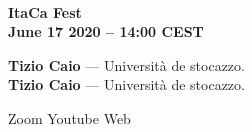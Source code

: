 \documentclass{article}
\makeatletter
\def\fsize#1#2{\fontsize{#1}{#1}\selectfont #2}
\newcommand{\talk}[3]{
  {\textbf{#1}} --- #2. \textit{#3}
} %
\makeatother
\begin{document}
\begin{flushright}
  \hrulefill\\[2mm]
  \noindent\fsize{40}{\textbf{ItaCa Fest}}\\[5mm]
  \fsize{25}{\textbf{June 17 2020 -- 14:00 CEST}}\\[5mm]
\end{flushright}

\large
\talk{Tizio Caio}{Università de stocazzo}{\lipsum[2]}\\[2em]

\talk{Tizio Caio}{Università de stocazzo}{\lipsum[2]}

\vspace*{\fill}
{\fsize{18}
\noindent Zoom \hspace{\fill}\faYoutube Youtube \hspace{\fill} Web}\\
\hrulefill
\end{document}
